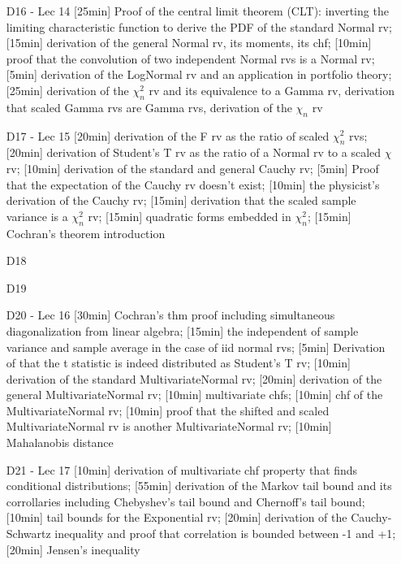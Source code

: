 \begin{enumerate}
\item[D16 - Lec 14] [25min] Proof of the central limit theorem (CLT): inverting the limiting characteristic function to derive the PDF of the standard Normal rv; [15min] derivation of the general Normal rv, its moments, its chf; [10min] proof that the convolution of two independent Normal rvs is a Normal rv; [5min] derivation of the LogNormal rv and an application in portfolio theory; [25min] derivation of the $\chi^2_n$ rv and its equivalence to a Gamma rv, derivation that scaled Gamma rvs are Gamma rvs, derivation of the $\chi_n$ rv

\item[D17 - Lec 15] [20min] derivation of the F rv as the ratio of scaled $\chi^2_n$ rvs; [20min] derivation of Student's T rv as the ratio of a Normal rv to a scaled $\chi$ rv; [10min] derivation of the standard and general Cauchy rv; [5min] Proof that the expectation of the Cauchy rv doesn't exist; [10min] the physicist's derivation of the Cauchy rv; [15min] derivation that the scaled sample variance is a $\chi^2_n$ rv; [15min] quadratic forms embedded in $\chi^2_n$; [15min] Cochran's theorem introduction


\item[D18] 
\item[D19] 


\item[D20 - Lec 16] [30min] Cochran's thm proof including simultaneous diagonalization from linear algebra; [15min] the independent of sample variance and sample average in the case of iid normal rvs; [5min] Derivation of that the t statistic is indeed distributed as Student's T rv; [10min] derivation of the standard MultivariateNormal rv; [20min] derivation of the general MultivariateNormal rv; [10min] multivariate chfs; [10min] chf of the MultivariateNormal rv; [10min] proof that the shifted and scaled MultivariateNormal rv is another MultivariateNormal rv; [10min] Mahalanobis distance

\item[D21 - Lec 17] [10min] derivation of multivariate chf property that finds conditional distributions; [55min] derivation of the Markov tail bound and its corrollaries including Chebyshev's tail bound and Chernoff's tail bound; [10min] tail bounds for the Exponential rv; [20min] derivation of the Cauchy-Schwartz inequality and proof that correlation is bounded between -1 and +1; [20min] Jensen's inequality


\end{enumerate}

